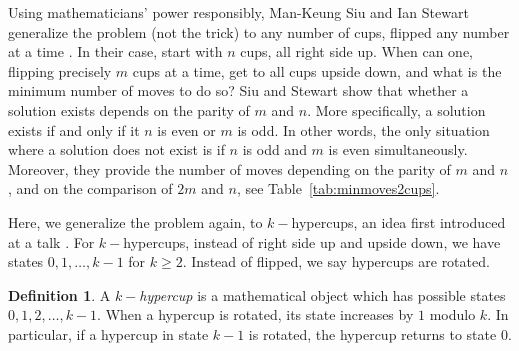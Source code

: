\documentclass{article}
\theoremstyle{theorem}
\theoremstyle{definition}
\newtheorem*{definition}{Definition}
\begin{document}
Using mathematicians' power responsibly, Man-Keung Siu and Ian Stewart generalize the problem (not the trick) to any number of cups, flipped any number at a time \cite{SS10}. In their case, start with $n$ cups, all right side up. When can one, flipping precisely $m$ cups at a time, get to all cups upside down, and what is the minimum number of moves to do so? Siu and Stewart show that whether a solution exists depends on the parity of $m$ and $n$. More specifically, a solution exists if and only if it $n$ is even or $m$ is odd. In other words, the only situation where a solution does not exist is if $n$ is odd and $m$ is even simultaneously. Moreover, they provide the number of moves depending on the parity of $m$ and $n$, and on the comparison of $2m$ and $n$, see Table~\ref{tab:minmoves2cups}.


\begin{table}[h!]
\centering
{}
\caption{Minimum number of moves for $2$-hypercups from \cite{SS10}}
\label{tab:minmoves2cups}
\end{table}

Here, we generalize the problem again, to $k-$hypercups, an idea first introduced at a talk \cite{SSDTalk}. For $k-$hypercups, instead of right side up and upside down, we have states $0,1,\dots, k-1$ for $k\ge 2$. Instead of flipped, we say hypercups are rotated.


\begin{definition}\label{def:hypercup}
    A \textit{$k-$hypercup} is a mathematical object which has possible states $0,1,2,\dots, k-1$. When a hypercup is rotated, its state increases by $1$ modulo $k$. In particular, if a hypercup in state $k-1$ is rotated, the hypercup returns to state $0$.
\end{definition}
\end{document}
